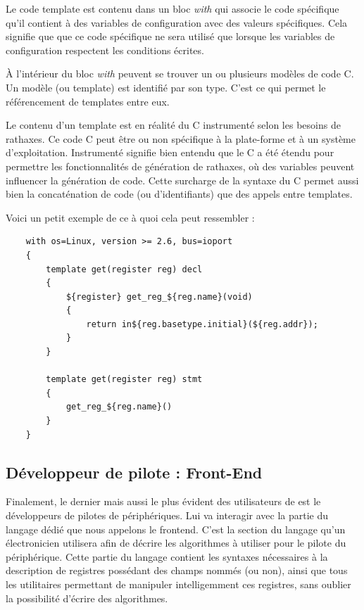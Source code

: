 \documentclass[french]{rtxreport}
\begin{document}
Le code template est contenu dans un bloc \emph{with} qui associe le code
spécifique qu'il contient à des variables de configuration avec des valeurs
spécifiques. Cela signifie que que ce code spécifique ne sera utilisé que
lorsque les variables de configuration respectent les conditions écrites.

À l'intérieur du bloc \emph{with} peuvent se trouver un ou plusieurs modèles de
code C. Un modèle (ou template) est identifié par son type. C'est ce qui permet
le référencement de templates entre eux.

Le contenu d'un template est en réalité du C instrumenté selon les besoins de
rathaxes. Ce code C peut être ou non spécifique à la plate-forme et à un système
d'exploitation. Instrumenté signifie bien entendu que le C a été étendu pour
permettre les fonctionnalités de génération de rathaxes, où des variables
peuvent influencer la génération de code. Cette surcharge de la syntaxe du C
permet aussi bien la concaténation de code (ou d'identifiants) que des appels
entre templates.

Voici un petit exemple de ce à quoi cela peut ressembler :
\begin{lstlisting}
    with os=Linux, version >= 2.6, bus=ioport
    {
        template get(register reg) decl
        {
            ${register} get_reg_${reg.name}(void)
            {
                return in${reg.basetype.initial}(${reg.addr});
            }
        }

        template get(register reg) stmt
        {
            get_reg_${reg.name}()
        }
    }
\end{lstlisting}

\subsection{Développeur de pilote : Front-End}
\lstset{language=rtx}

Finalement, le dernier mais aussi le plus évident des utilisateurs de \rtx est
le développeurs de pilotes de périphériques. Lui va interagir avec la partie du
langage dédié que nous appelons le frontend. C'est la section du langage qu'un
électronicien utilisera afin de décrire les algorithmes à utiliser pour le
pilote du périphérique. Cette partie du langage contient les syntaxes
nécessaires à la description de registres possédant des champs nommés (ou non),
ainsi que tous les utilitaires permettant de manipuler intelligemment ces
registres, sans oublier la possibilité d'écrire des algorithmes.
\end{document}
